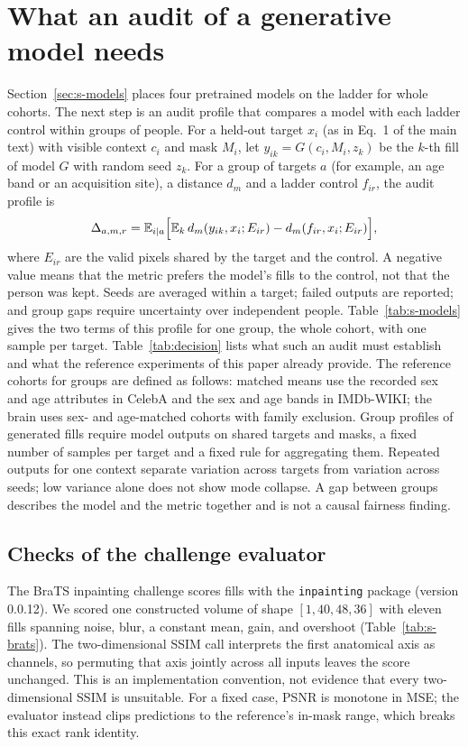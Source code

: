 \section{What an audit of a generative model needs}
\label{sec:s-audit}
Section~\ref{sec:s-models} places four pretrained models on the ladder for whole cohorts.
The next step is an audit profile that compares a model with each ladder control within groups of people.
For a held-out target $x_i$ (as in Eq.~1 of the main text) with visible context $c_i$ and mask $M_i$, let $y_{ik}=G(c_i,M_i,z_k)$ be the $k$-th fill of model $G$ with random seed $z_k$.
For a group of targets $a$ (for example, an age band or an acquisition site), a distance $d_m$ and a ladder control $f_{ir}$, the audit profile is
\begin{equation}
\Delta_{a,m,r}=\mathbb E_{i\mid a}\Bigl[\mathbb E_k\, d_m(y_{ik},x_i;E_{ir})-d_m(f_{ir},x_i;E_{ir})\Bigr],
\label{eq:audit}
\end{equation}
where $E_{ir}$ are the valid pixels shared by the target and the control.
A negative value means that the metric prefers the model's fills to the control, not that the person was kept.
Seeds are averaged within a target; failed outputs are reported; and group gaps require uncertainty over independent people.
Table~\ref{tab:s-models} gives the two terms of this profile for one group, the whole cohort, with one sample per target.
Table~\ref{tab:decision} lists what such an audit must establish and what the reference experiments of this paper already provide.
The reference cohorts for groups are defined as follows: matched means use the recorded sex and age attributes in CelebA and the sex and age bands in IMDb-WIKI; the brain uses sex- and age-matched cohorts with family exclusion.
Group profiles of generated fills require model outputs on shared targets and masks, a fixed number of samples per target and a fixed rule for aggregating them.
Repeated outputs for one context separate variation across targets from variation across seeds; low variance alone does not show mode collapse.
A gap between groups describes the model and the metric together and is not a causal fairness finding.



\subsection{Checks of the challenge evaluator}
The BraTS inpainting challenge scores fills with the \texttt{inpainting} package (version 0.0.12).
We scored one constructed volume of shape $[1,40,48,36]$ with eleven fills spanning noise, blur, a constant mean, gain, and overshoot (Table~\ref{tab:s-brats}).
The two-dimensional SSIM call interprets the first anatomical axis as channels, so permuting that axis jointly across all inputs leaves the score unchanged.
This is an implementation convention, not evidence that every two-dimensional SSIM is unsuitable.
For a fixed case, PSNR is monotone in MSE; the evaluator instead clips predictions to the reference's in-mask range, which breaks this exact rank identity.

